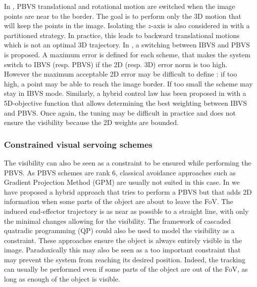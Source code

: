 \documentclass[letterpaper, 10 pt, conference]{IEEEtran}  %
\begin{document}
In \cite{chesi2004keeping}, PBVS translational and rotational motion are switched when the image points are near to the border. The goal is to perform only the 3D motion that will keep the points in the image.
Isolating the $z$-axis is also considered in \cite{corke2001new} with a partitioned strategy.
In practice, this leads to backward translational motions which is not an optimal 3D trajectory.
In \cite{gans2007stable}, a switching between IBVS and PBVS is proposed.
A maximum error is defined for each scheme, that makes the system switch to IBVS (resp. PBVS) if the 2D (resp. 3D) error norm is too high.
However the maximum acceptable 2D error may be difficult to define%
: if too high, a point may be able to reach the image border. If too small the scheme may stay in IBVS mode.
Similarly, a hybrid control law has been proposed in \cite{hafez2007visual} with a 5D-objective function that allows determining the best weighting between IBVS and PBVS.
Once again, the tuning may be difficult in practice and does not ensure the visibility because the 2D weights are bounded.

\subsubsection{Constrained visual servoing schemes}

The visibility can also be seen as a constraint to be ensured while performing the PBVS. 
As PBVS schemes are rank 6, classical avoidance approaches such as Gradient Projection Method (GPM) \cite{yoshikawa1996basic} are usually not suited in this case.
In \cite{Kermorgant11b} we have proposed a hybrid approach that tries to perform a PBVS but that adds 2D information when some parts of the object are about to leave the FoV. The induced end-effector trajectory is as near as possible to a straight line, with only the minimal changes allowing for the visibility.
The framework of cascaded quatradic programming (QP) \cite{kanoun2010kinematic} could also be used to model the visibility as a constraint.
These approaches ensure the object is always entirely visible in the image. Paradoxically this may also be seen as a too important constraint that may prevent the system from reaching its desired position. Indeed, the tracking can usually be performed even if some parts of the object are out of the FoV, as long as enough of the object is visible.
\end{document}
